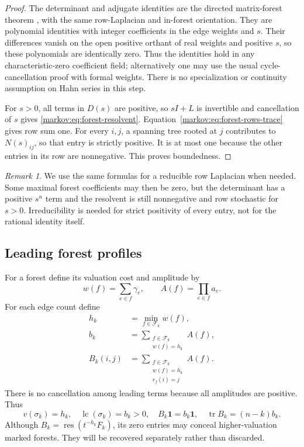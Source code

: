 \documentclass[11pt]{article}
\numberwithin{equation}{section}
\theoremstyle{definition}
\theoremstyle{remark}
\newtheorem{remark}[theorem]{Remark}
\newcommand{\F}{\mathcal F}
\newcommand{\one}{\mathbf 1}
\newcommand{\res}{\operatorname{res}}
\newcommand{\lc}{\operatorname{lc}}
\newcommand{\tr}{\operatorname{tr}}
\begin{document}
\begin{proof}
The determinant and adjugate identities are the directed matrix-forest theorem
\cite[Propositions~2 and~3]{CA}, with the same row-Laplacian and
in-forest orientation. They are polynomial identities with integer coefficients
in the edge weights and $s$. Their differences vanish on the open positive
orthant of real weights and positive $s$, so these polynomials are identically
zero. Thus the identities hold in any characteristic-zero coefficient field;
alternatively one may use the usual cycle-cancellation proof with formal
weights. There is no specialization or
continuity assumption on Hahn series in this step.

For $s>0$, all terms in $D(s)$ are positive, so $sI+L$ is invertible and cancellation
of $s$ gives \eqref{markov:eq:forest-resolvent}. Equation~\eqref{markov:eq:forest-rows-trace}
gives row sum one. For every $i,j$, a spanning tree rooted at $j$ contributes to
$N(s)_{ij}$, so that entry is strictly positive. It is at most one because the
other entries in its row are nonnegative. This proves boundedness.
\end{proof}

\begin{remark}
We use the same formulas for a reducible row Laplacian when needed. Some maximal
forest coefficients may then be zero, but the determinant has a positive
$s^n$ term and the resolvent is still nonnegative and row stochastic for $s>0$.
Irreducibility is needed for strict positivity of every entry, not for the
rational identity itself.
\end{remark}

\subsection{Leading forest profiles}

For a forest define its valuation cost and amplitude by
\begin{equation}\label{markov:eq:forest-leading}
 w(f)=\sum_{e\in f}\gamma_e,
 \qquad A(f)=\prod_{e\in f}a_e.
\end{equation}
For each edge count define
\begin{align}
 h_k&=\min_{f\in\F_k}w(f),\label{markov:eq:profile-h}\\
 b_k&=\sum_{\substack{f\in\F_k\\w(f)=h_k}}A(f),\label{markov:eq:profile-b}\\
 B_k(i,j)&=\sum_{\substack{f\in\F_k\\w(f)=h_k\\r_f(i)=j}}A(f).
 \label{markov:eq:profile-B}
\end{align}
There is no cancellation among leading terms because all amplitudes are positive.
Thus
\begin{equation}\label{markov:eq:profile-properties}
 v(\sigma_k)=h_k,\quad
 \lc(\sigma_k)=b_k>0,\quad
 B_k\one=b_k\one,\quad
 \tr B_k=(n-k)b_k.
\end{equation}
Although $B_k=\res(t^{-h_k}F_k)$, its zero entries may conceal higher-valuation
marked forests. They will be recovered separately rather than discarded.
\end{document}
